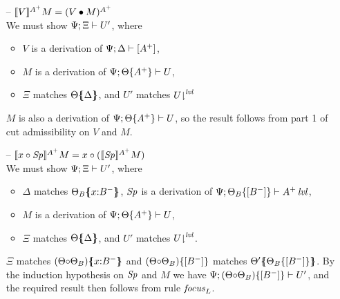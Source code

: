 \begin{itemize}
\item[--] $\lsubsta{\tfocusr{V}}{M}{A^+} = (\subst{V}{M})^{A^+}$\smallskip\\
  We must show $\foc{\Psi}{\Xi}{U'}$, where
  \begin{itemize}
  \item $V$ is a derivation of $\foc{\Psi}{\Delta}{[A^+]}$,
  \item $M$ is a derivation of $\foc{\Psi}{\tackon{\Theta}{A^+}}{U}$,
  \item $\Xi$ matches $\frameoff{\Theta}{\Delta}$, and $U'$ matches 
    $\restrictfrom{U}{\mlvl}$
  \end{itemize}
  $M$ is also a derivation of $\foc{\Psi}{\tackon{\Theta}{A^+}}{U}$,
  so the result follows from part 1 of cut admissibility
  on $V$ and $M$. \smallskip

\item[--] $\lsubsta{\tfocusl{x}{\Sp}}{M}{A^+}
           = \tfocusl{x}{(\lsubsta{\Sp}{M}{A^+})}$\smallskip\\
  We must show $\foc{\Psi}{\Xi}{U'}$, where
  \begin{itemize}
  \item $\Delta$ matches $\frameoff{\Theta_B}{x{:}B^-}$, 
    $\Sp$ is a derivation of
    $\foc{\Psi}{\tackon{\Theta_B}{[B^-]}}{\islvl{A^+}}$,
  \item $M$ is a derivation of $\foc{\Psi}{\tackon{\Theta}{A^+}}{U}$,
  \item $\Xi$ matches $\frameoff{\Theta}{\Delta}$, and $U'$ matches 
    $\restrictfrom{U}{\mlvl}$.
  \end{itemize}
  $\Xi$ matches $\frameoff{(\Theta {\circ} \Theta_B)}{x{:}B^-}$
  and $\tackon{(\Theta {\circ} \Theta_B)}{[B^-]}$ matches
  $\frameoff{\Theta'}{\tackon{\Theta_B}{[B^-]}}$. By the induction
  hypothesis on $\Sp$ and $M$ we have 
  $\foc{\Psi}{\tackon{(\Theta {\circ} \Theta_B)}{[B^-]}}{U'}$, and
  the required result then follows from rule ${\it focus}_L$. \smallskip
  

\end{itemize}
